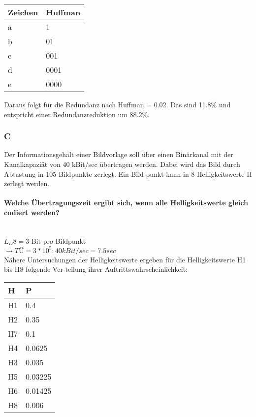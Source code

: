 \begin{center}
    \centering
    \begin{tabular}{l | l}
        \bfseries{Zeichen} & \bfseries{Huffman}\\ \hline
        a & 1\\ 
        b & 01\\
        c & 001\\
        d & 0001\\
        e & 0000\\
    \end{tabular}
\end{center}

Daraus folgt für die Redundanz nach Huffman = 0.02. 
Das sind 11.8\% und entspricht einer Redundanzreduktion um 88.2\%.

\subsubsection{C}
Der Informationsgehalt einer Bildvorlage soll über einen Binärkanal mit der Kanalkapaziät von 40 kBit/sec übertragen werden. Dabei wird das Bild durch Abtastung in 105 Bildpunkte zerlegt. Ein Bild-punkt kann in 8 Helligkeitswerte H zerlegt werden.

\paragraph{Welche Übertragungszeit ergibt sich, wenn alle Helligkeitswerte gleich codiert werden?}\mbox{}\\
$L_D 8=3$ Bit pro Bildpunkt\\
$\rightarrow TÜ = 3*10^5:40kBit/sec=7.5sec$\\

Nähere Untersuchungen der Helligkeitswerte ergeben für die Helligkeitswerte H1 bis H8 folgende Ver-teilung ihrer Auftrittswahrscheinlichkeit:
\begin{center}
    \centering
    \begin{tabular}{l | l}
        \bfseries{H} & \bfseries{P}\\ \hline
        H1 & 0.4\\ 
        H2 & 0.35\\
        H7 & 0.1\\
        H4 & 0.0625\\
        H3 & 0.035\\
        H5 & 0.03225\\
        H6 & 0.01425\\
        H8 & 0.006
    \end{tabular}
\end{center}

